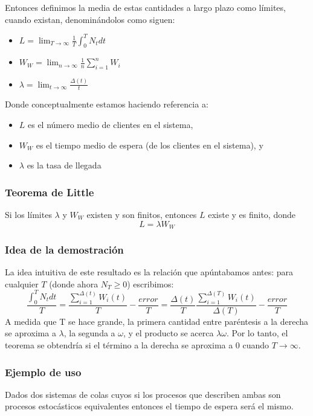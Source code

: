 \documentclass[8pt]{beamer}
\begin{document}
  \begin{frame}
  	Entonces definimos la media de estas cantidades a largo plazo como límites, cuando existan, denominándolos
  	como siguen:
  	
  	\begin{itemize}
  		\item $L = \lim_{T\to \infty}\frac{1}{T} \int_{0}^{T} N_t dt$
  		\item $W_W = \lim_{n\to \infty}\frac{1}{n} \sum_{i=1}^{n} W_i$
  		\item $\lambda = \lim_{t\to \infty}\frac{\Delta(t)}{t}$
  	\end{itemize}
  	
  	Donde conceptualmente estamos haciendo referencia a:
  	\begin{itemize}
  		\item $L$ es el número medio de clientes en el sistema,
  		\item $W_W$ es el tiempo medio de espera (de los clientes en el sistema), y
  		\item $\lambda$ es la tasa de llegada 
  	\end{itemize}
  \end{frame}
  
  \begin{frame}\frametitle{Teorema de Little}
    Si los límites $\lambda$ y $W_W$ existen y son finitos, entonces $L$ existe y es finito, donde 
    \[L = \lambda W_W\]
  \end{frame}
  \begin{frame}\frametitle{Idea de la demostración}
  	La idea intuitiva de este resultado es la relación que apúntabamos antes: para cualquier $T$ (donde ahora $N_T \geq 0$) escribimos:
  	\[ \frac{\int_{0}^{T} N_t dt}{T}=\frac{\sum_{i=1}^{\Delta (t)} W_i(t)}{T}-\frac{error}{T}=\frac{\Delta(t)}{T}\frac{\sum_{i=1}^{\Delta (T)} W_i(t)}{\Delta(T)}-\frac{error}{T}   \]
  	A medida que T se hace grande, la primera cantidad entre paréntesis a la derecha se aproxima a $\lambda$, la segunda a $\omega$, 
  	y el producto se acerca $\lambda\omega$. Por lo tanto, el teorema se obtendría si el término a la derecha 
  	se aproxima a 0 cuando $T\rightarrow\infty$. 
  \end{frame}
   \begin{frame}\frametitle{Ejemplo de uso}
   	Dados dos sistemas de colas cuyos si los procesos que describen ambas son procesos estocásticos equivalentes entonces el tiempo de espera será el mismo. 
   \end{frame} 
  
\end{document}
